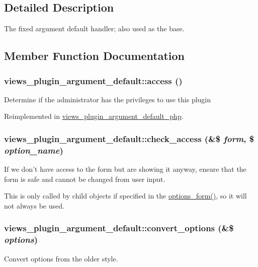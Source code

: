 \subsection{Detailed Description}
The fixed argument default handler; also used as the base. 

\subsection{Member Function Documentation}
\hypertarget{classviews__plugin__argument__default_a47b0a69da2fb0e45c25aa9c8727f912f}{
\subsubsection[{access}]{\setlength{\rightskip}{0pt plus 5cm}views\_\-plugin\_\-argument\_\-default::access ()}}
\label{classviews__plugin__argument__default_a47b0a69da2fb0e45c25aa9c8727f912f}
Determine if the administrator has the privileges to use this plugin 

Reimplemented in \hyperlink{classviews__plugin__argument__default__php_aff864fbd2dcbea7ecd3589429bbf3a2a}{views\_\-plugin\_\-argument\_\-default\_\-php}.\hypertarget{classviews__plugin__argument__default_a096aef18bee162b1c78745379a018836}{
\subsubsection[{check\_\-access}]{\setlength{\rightskip}{0pt plus 5cm}views\_\-plugin\_\-argument\_\-default::check\_\-access (\&\$ {\em form}, \/  \$ {\em option\_\-name})}}
\label{classviews__plugin__argument__default_a096aef18bee162b1c78745379a018836}
If we don't have access to the form but are showing it anyway, ensure that the form is safe and cannot be changed from user input.

This is only called by child objects if specified in the \hyperlink{classviews__plugin__argument__default_a9bc59dae448f4c35d422bc54d0879930}{options\_\-form()}, so it will not always be used. \hypertarget{classviews__plugin__argument__default_a4f4afb816d9f6451a7d070fa7b75c8c2}{
\subsubsection[{convert\_\-options}]{\setlength{\rightskip}{0pt plus 5cm}views\_\-plugin\_\-argument\_\-default::convert\_\-options (\&\$ {\em options})}}
\label{classviews__plugin__argument__default_a4f4afb816d9f6451a7d070fa7b75c8c2}
Convert options from the older style.

